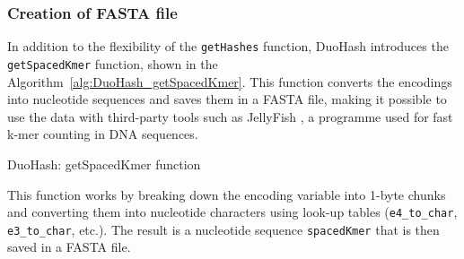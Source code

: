 \subsubsection*{Creation of FASTA file}
In addition to the flexibility of the \verb|getHashes| function, DuoHash introduces the \verb|getSpacedKmer| function, shown in the Algorithm~\ref{alg:DuoHash_getSpacedKmer}. This function converts the encodings into nucleotide sequences and saves them in a FASTA file, making it possible to use the data with third-party tools such as JellyFish \cite{marcais2011jellyfish}, a programme used for fast k-mer counting in \acs{DNA} sequences.

\begin{algorithm}[!ht]
	\caption{DuoHash: getSpacedKmer function}
	\label{alg:DuoHash_getSpacedKmer}
	
\end{algorithm}

This function works by breaking down the encoding variable into 1-byte chunks and converting them into nucleotide characters using look-up tables (\verb|e4_to_char|, \verb|e3_to_char|, etc.). The result is a nucleotide sequence \verb|spacedKmer| that is then saved in a FASTA file.
